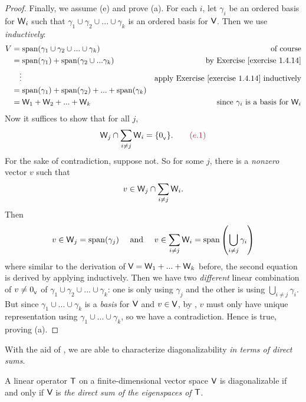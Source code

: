 \begin{proof}
Finally, we assume (e) and prove (a).
For each \(i\), let \(\gamma_i\) be an ordered basis for \(\textsf{W}_i\) such that \(\gamma_1 \cup \gamma_2 \cup ... \cup \gamma_k\) is an ordered basis for \(\textsf{V}\).
Then we use  \emph{inductively}:
\begin{align*}
    V & = \spann(\gamma_1 \cup \gamma_2 \cup ... \cup \gamma_k) & \text{of course} \\
      & = \spann(\gamma_1) + \spann(\gamma_2 \cup ... \gamma_k) & \text{by \EXEC{1.4.14}} \\
      & \quad \vdots & \text{apply \EXEC{1.4.14} inductively} \\
      & = \spann(\gamma_1) + \spann(\gamma_2) + ... + \spann(\gamma_k) \\
      & = \W_1 + \W_2 + ... + \W_k & \text{since \(\gamma_i\) is a basis for \(\W_i\)}
\end{align*}
Now it suffices to show that for all \(j\),
\[
    \W_j \cap \sum_{i \ne j} \W_{i} = \{ \OV \}. \quad \quad \MAROON{(e.1)}
\]
For the sake of contradiction, suppose not.
So for some \(j\), there is a \emph{nonzero} vector \(v\) such that
\[
    v \in \textsf{W}_j \cap \sum_{i \ne j} \textsf{W}_i.
\]
Then
\[
    v \in \textsf{W}_j = \operatorname{span}(\gamma_j)
    \quad \text{ and } \quad
    v \in \sum_{i \ne j} \textsf{W}_i = \operatorname{span} \left( \bigcup_{i \ne j} \gamma_i \right)
\]
where similar to the derivation of \(\textsf{V} = \textsf{W}_1 + ... + \textsf{W}_k\) before, the second equation is derived by applying  inductively.
Then we have two \emph{different} linear combination of \(v \ne 0_{_{\textsf{V}}}\) of \(\gamma_1 \cup \gamma_2 \cup ... \cup \gamma_k\): one is only using \(\gamma_j\) and the other is using \(\bigcup_{i \ne j} \gamma_i\).
But since \(\gamma_1 \cup ... \cup \gamma_k\) is a \emph{basis} for \(\textsf{V}\) and \(v \in \textsf{V}\), by , \(v\) must only have unique representation using \(\gamma_1 \cup ... \cup \gamma_k\), so we have a contradiction.
Hence  is true, proving (a).
\end{proof}

With the aid of , we are able to characterize diagonalizability \emph{in terms of direct sums}.

\begin{theorem} \label{thm 5.10}
A linear operator \(\textsf{T}\) on a finite-dimensional vector space \(\textsf{V}\) is diagonalizable if and only if \(\textsf{V}\) is \emph{the direct sum of the eigenspaces of \(\textsf{T}\)}.
\end{theorem}

